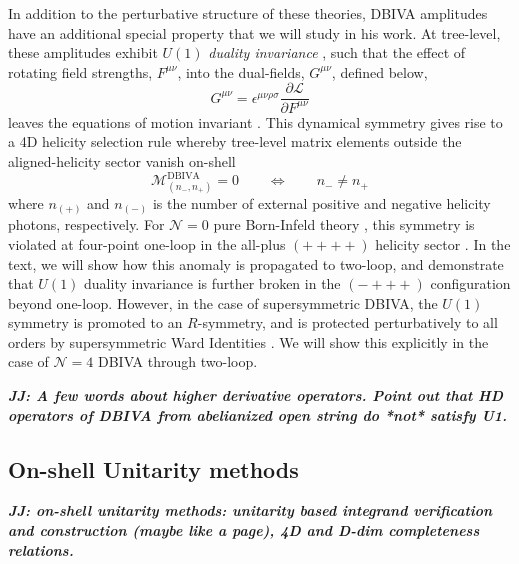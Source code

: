 \documentclass[12pt,letter]{article}
\def\be{\begin{equation}}
\def\ee{\end{equation}}
\def\dj#1{{\color{NUpurple}\it \bf JJ: #1}}
\begin{document}
In addition to the perturbative structure of these theories, DBIVA amplitudes have an additional special property that we will study in his work. At tree-level, these amplitudes exhibit $U(1)$ \textit{duality invariance} \cite{Bossard:2012xs,Novotny:2018iph}, such that the effect of rotating field strengths, $F^{\mu\nu}$, into the dual-fields, $G^{\mu\nu}$, defined below,
\be
G^{\mu\nu} = \epsilon^{\mu\nu\rho\sigma}\frac{\partial \mathcal{L}}{\partial F^{\mu\nu}}
\ee
leaves the equations of motion invariant \cite{Gibbons:1995ap,Babaei-Aghbolagh:2013hia}. This dynamical symmetry gives rise to a 4D helicity selection rule \cite{Novotny:2018iph} whereby tree-level matrix elements outside the aligned-helicity sector vanish on-shell
\be
\mathcal{M}^{\text{DBIVA}}_{(n_{-}, n_{+})} =0 \qquad \Leftrightarrow \qquad n_{-}\neq n_{+}
\ee
where $n_{(+)}$ and $n_{(-)}$ is the number of external positive and negative helicity photons, respectively. For $\mathcal{N}=0$ pure Born-Infeld theory \cite{Born:1934gh,Schrodinger:1935oqa}, this symmetry is violated at four-point one-loop in the all-plus $(++++)$ helicity sector \cite{Elvang:2019twd}. In the text, we will show how this anomaly is propagated to two-loop, and demonstrate that $U(1)$ duality invariance is further broken in the $(-+++)$ configuration beyond one-loop. However, in the case of supersymmetric DBIVA, the $U(1)$ symmetry is promoted to an $R$-symmetry, and is protected perturbatively to all orders by supersymmetric Ward Identities \cite{Heydeman:2017yww}. We will show this explicitly in the case of $\mathcal{N}=4$ DBIVA through two-loop. 

\dj{A few words about higher derivative operators.  Point out that HD operators of DBIVA from abelianized open string do *not* satisfy U1.}


\subsection{On-shell Unitarity methods }\label{sec:genU}
\dj{on-shell unitarity methods: unitarity based integrand verification and construction (maybe like a page), 4D and D-dim completeness relations. }
\end{document}

